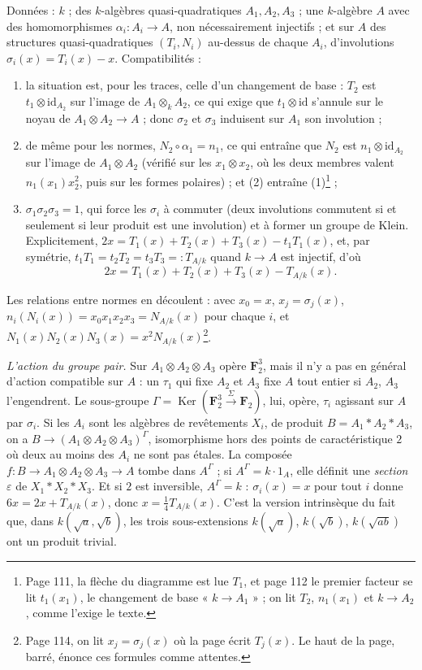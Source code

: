 \documentclass[11pt,a4paper]{article}
\begin{document}
Données : $k$ ; des $k$-algèbres quasi-quadratiques $A_1, A_2, A_3$ ; une
$k$-algèbre $A$ avec des homomorphismes $\alpha_i : A_i \to A$, non nécessairement
injectifs ; et sur $A$ des structures quasi-quadratiques $(T_i, N_i)$ au-dessus de
chaque $A_i$, d'involutions $\sigma_i(x) = T_i(x) - x$. Compatibilités :
\begin{enumerate}
\item[(1)] la situation est, pour les traces, celle d'un changement de base :
$T_2$ est $t_1 \otimes \mathrm{id}_{A_2}$ sur l'image de $A_1 \otimes_k A_2$, ce qui exige
que $t_1 \otimes \mathrm{id}$ s'annule sur le noyau de $A_1 \otimes A_2 \to A$ ; donc
$\sigma_2$ et $\sigma_3$ induisent sur $A_1$ son involution ;
\item[(2)] de même pour les normes, $N_2 \circ \alpha_1 = n_1$, ce qui entraîne que $N_2$
est $n_1 \otimes \mathrm{id}_{A_2}$ sur l'image de $A_1 \otimes A_2$ (vérifié sur les
$x_1 \otimes x_2$, où les deux membres valent $n_1(x_1)x_2^{2}$, puis sur les formes
polaires) ; et (2) entraîne (1)\footnote{Page 111, la flèche du diagramme est lue
$T_1$, et page 112 le premier facteur se lit $t_1(x_1)$, le changement de base
« $k \to A_1$ » ; on lit $T_2$, $n_1(x_1)$ et $k \to A_2$, comme l'exige le texte.} ;
\item[(3)] $\sigma_1\sigma_2\sigma_3 = 1$, qui force les $\sigma_i$ à commuter (deux
involutions commutent si et seulement si leur produit est une involution) et à
former un groupe de Klein. Explicitement, $2x = T_1(x) + T_2(x) + T_3(x) -
t_1T_1(x)$, et, par symétrie, $t_1T_1 = t_2T_2 = t_3T_3 =: T_{A/k}$ quand $k \to A$
est injectif, d'où
\[
  2x = T_1(x) + T_2(x) + T_3(x) - T_{A/k}(x).
\]
\end{enumerate}
Les relations entre normes en découlent : avec $x_0 = x$, $x_j = \sigma_j(x)$,
$n_i(N_i(x)) = x_0x_1x_2x_3 = N_{A/k}(x)$ pour chaque $i$, et
$N_1(x)N_2(x)N_3(x) = x^{2}N_{A/k}(x)$\footnote{Page 114, on lit $x_j = \sigma_j(x)$
où la page écrit $T_j(x)$. Le haut de la page, barré, énonce ces formules comme
attentes.}.

\emph{L'action du groupe pair.} Sur $A_1 \otimes A_2 \otimes A_3$ opère $\mathbf{F}_2^{3}$,
mais il n'y a pas en général d'action compatible sur $A$ : un $\tau_1$ qui fixe $A_2$
et $A_3$ fixe $A$ tout entier si $A_2$, $A_3$ l'engendrent. Le sous-groupe
$\Gamma = \operatorname{Ker}(\mathbf{F}_2^{3} \xrightarrow{\Sigma} \mathbf{F}_2)$, lui, opère, $\tau_i$
agissant sur $A$ par $\sigma_i$. Si les $A_i$ sont les algèbres de revêtements
$X_i$, de produit $B = A_1 * A_2 * A_3$, on a $B \to (A_1 \otimes A_2 \otimes A_3)^{\Gamma}$,
isomorphisme hors des points de caractéristique $2$ où deux au moins des $A_i$ ne
sont pas étales. La composée $f : B \to A_1 \otimes A_2 \otimes A_3 \to A$ tombe dans
$A^{\Gamma}$ ; si $A^{\Gamma} = k\cdot 1_A$, elle définit une \emph{section} $\varepsilon$
de $X_1 * X_2 * X_3$. Et si $2$ est inversible, $A^{\Gamma} = k$ : $\sigma_i(x) = x$
pour tout $i$ donne $6x = 2x + T_{A/k}(x)$, donc $x = \tfrac{1}{4}T_{A/k}(x)$. C'est la
version intrinsèque du fait que, dans $k(\sqrt{a}, \sqrt{b})$, les trois
sous-extensions $k(\sqrt{a})$, $k(\sqrt{b})$, $k(\sqrt{ab})$ ont un produit trivial.
\end{document}
